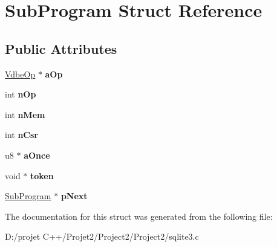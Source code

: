 \hypertarget{struct_sub_program}{}\section{Sub\+Program Struct Reference}
\label{struct_sub_program}
\subsection*{Public Attributes}
\begin{DoxyCompactItemize}
\item 
\mbox{\label{struct_sub_program_aa9bb1992fed633d182076a35d6448c7d}} 
\mbox{\hyperlink{struct_vdbe_op}{Vdbe\+Op}} $\ast$ {\bfseries a\+Op}
\item 
\mbox{\label{struct_sub_program_a6fe204a75ab8254c453be77f024b6d69}} 
int {\bfseries n\+Op}
\item 
\mbox{\label{struct_sub_program_a9bece42fdeb81085809d7c2f8aa05616}} 
int {\bfseries n\+Mem}
\item 
\mbox{\label{struct_sub_program_a83b18aa5cc63aecdbf996c16af1e48bb}} 
int {\bfseries n\+Csr}
\item 
\mbox{\label{struct_sub_program_a08810bb6a2a18d1a92e064f5269a6790}} 
u8 $\ast$ {\bfseries a\+Once}
\item 
\mbox{\label{struct_sub_program_aaea3b67899b092476b107d22a4e2022d}} 
void $\ast$ {\bfseries token}
\item 
\mbox{\label{struct_sub_program_a7da35488ac58a64fa30b88da56aac8b3}} 
\mbox{\hyperlink{struct_sub_program}{Sub\+Program}} $\ast$ {\bfseries p\+Next}
\end{DoxyCompactItemize}


The documentation for this struct was generated from the following file\+:\begin{DoxyCompactItemize}
\item 
D\+:/projet C++/\+Projet2/\+Project2/\+Project2/sqlite3.\+c\end{DoxyCompactItemize}
